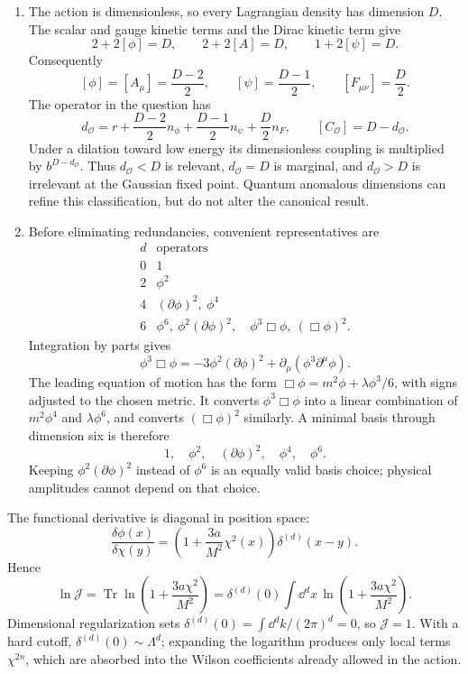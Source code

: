 
\begin{enumerate}
\begin{enumerate}
\item
The action is dimensionless, so every Lagrangian density has dimension
\(D\).  The scalar and gauge kinetic terms and the Dirac kinetic term give
\[
 2+2[\phi]=D,\qquad 2+2[A]=D,\qquad
 1+2[\psi]=D.
\]
Consequently
\[
 [\phi]=[A_\mu]=\frac{D-2}{2},\qquad
 [\psi]=\frac{D-1}{2},\qquad [F_{\mu\nu}]=\frac D2.
\]
The operator in the question has
\[
 d_{\mathcal O}=r+\frac{D-2}{2}n_\phi
 +\frac{D-1}{2}n_\psi+\frac D2n_F,
 \qquad [C_{\mathcal O}]=D-d_{\mathcal O}.
\]
Under a dilation toward low energy its dimensionless coupling is multiplied
by \(b^{D-d_{\mathcal O}}\).  Thus \(d_{\mathcal O}<D\) is relevant,
\(d_{\mathcal O}=D\) is marginal, and \(d_{\mathcal O}>D\) is irrelevant at
the Gaussian fixed point.  Quantum anomalous dimensions can refine this
classification, but do not alter the canonical result.
\item
Before eliminating redundancies, convenient representatives are
\[
\begin{array}{c|l}
d&\text{operators}\\ \hline
0&1\\
2&\phi^2\\
4&(\partial\phi)^2,\ \phi^4\\
6&\phi^6,\ \phi^2(\partial\phi)^2,\quad
   \phi^3\Box\phi,\ (\Box\phi)^2 .
\end{array}
\]
Integration by parts gives
\[
 \phi^3\Box\phi=-3\phi^2(\partial\phi)^2+\partial_\mu
 (\phi^3\partial^\mu\phi).
\]
The leading equation of motion has the form
\(\Box\phi=m^2\phi+\lambda\phi^3/6\), with signs adjusted to the chosen
metric.  It converts \(\phi^3\Box\phi\) into a linear combination of
\(m^2\phi^4\) and \(\lambda\phi^6\), and converts
\((\Box\phi)^2\) similarly.  A minimal basis through dimension six is
therefore
\[
 \boxed{1,\quad\phi^2,\quad(\partial\phi)^2,\quad\phi^4,\quad\phi^6.}
\]
Keeping \(\phi^2(\partial\phi)^2\) instead of \(\phi^6\) is an equally valid
basis choice; physical amplitudes cannot depend on that choice.
\end{enumerate}

The functional derivative is diagonal in position space:
\[
 \frac{\delta\phi(x)}{\delta\chi(y)}
 =\left(1+\frac{3a}{M^2}\chi^2(x)\right)\delta^{(d)}(x-y).
\]
Hence
\[
 \ln\mathcal J
 =\operatorname{Tr}\ln\left(1+\frac{3a\chi^2}{M^2}\right)
 =\delta^{(d)}(0)\int \dd^dx\,
 \ln\left(1+\frac{3a\chi^2}{M^2}\right).
\]
Dimensional regularization sets
\(\delta^{(d)}(0)=\int \dd^dk/(2\pi)^d=0\), so \(\mathcal J=1\).
With a hard cutoff, \(\delta^{(d)}(0)\sim\Lambda^d\); expanding the
logarithm produces only local terms \(\chi^{2n}\), which are absorbed into
the Wilson coefficients already allowed in the action.


\end{enumerate}
